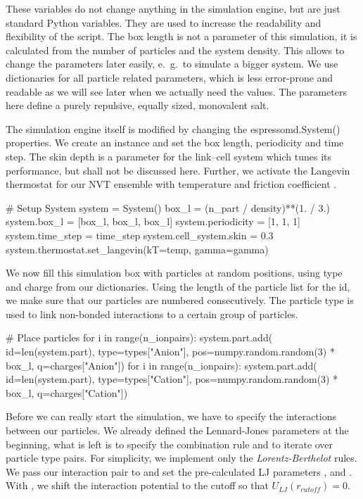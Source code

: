 \documentclass[
a4paper,                        %
11pt,                           %
twoside,                        %
footsepline,                    %
headsepline,                    %
headexclude,                    %
footexclude,                    %
pagesize,                       %
]{scrartcl}
\begin{document}
These variables do not change anything in the simulation engine, but
are just standard Python variables. They are used to increase the
readability and flexibility of the script. The box length is not a
parameter of this simulation, it is calculated from the number of
particles and the system density. This allows to change the parameters
later easily, e.~g.\ to simulate a bigger system.
We use dictionaries for all particle related parameters, which is less error-prone and
readable as we will see later when we actually need the values. The parameters here define a purely repulsive, 
equally sized, monovalent salt.

The simulation engine itself is modified by changing the
espressomd.System() properties. We create an instance  and
set the box length, periodicity and time step. The skin depth  
is a parameter for the link--cell system which tunes its
performance, but shall not be discussed here. Further, we activate the Langevin thermostat
for our NVT ensemble with temperature  and friction coefficient . 


\begin{pypresso}
# Setup System
system = System()
box_l = (n_part / density)**(1. / 3.)
system.box_l = [box_l, box_l, box_l]
system.periodicity = [1, 1, 1]
system.time_step = time_step
system.cell_system.skin = 0.3
system.thermostat.set_langevin(kT=temp, gamma=gamma)
\end{pypresso}

We now fill this simulation box with particles at random positions, using type and charge from our dictionaries.
Using the length of the particle list  for the id, we make sure that our particles are numbered consecutively.
The particle type is used to link non-bonded interactions to a certain group of particles.

\begin{pypresso}
# Place particles
for i in range(n_ionpairs):
    system.part.add(
            id=len(system.part), 
            type=types["Anion"],  
            pos=numpy.random.random(3) * box_l, 
            q=charges["Anion"])
for i in range(n_ionpairs):
    system.part.add(
            id=len(system.part), 
            type=types["Cation"], 
            pos=numpy.random.random(3) * box_l, 
            q=charges["Cation"])
\end{pypresso}

Before we can really start the simulation, we have to specify the
interactions between our particles. We already defined the Lennard-Jones parameters at the beginning,
what is left is to specify the combination rule and to iterate over particle type pairs. For simplicity, 
we implement only the \emph{Lorentz-Berthelot} rules. 
We pass our interaction pair to  and set the 
pre-calculated LJ parameters ,  and . With ,
we shift the interaction potential to the cutoff so that $U_{LJ}(r_{cutoff})=0$.
\end{document}
